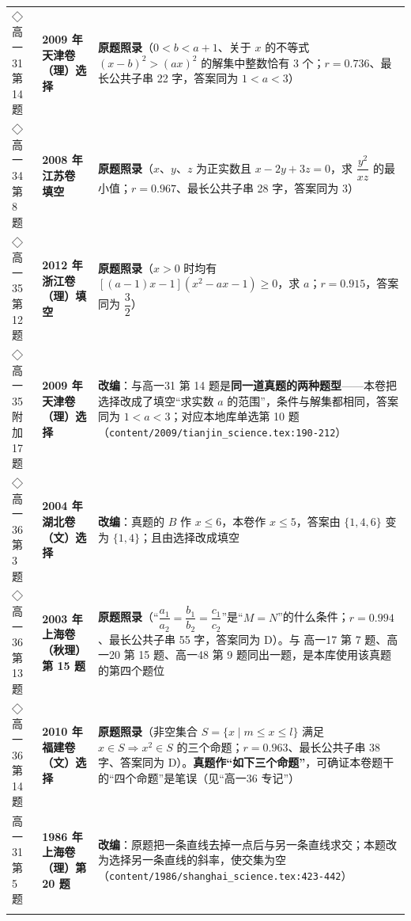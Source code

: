 \documentclass[a4paper,11pt]{article}
\begin{document}
\begin{xltabular}{\textwidth}{@{}>{\raggedright\arraybackslash}p{2.85cm}>{\raggedright\arraybackslash}p{3.99cm}>{\raggedright\arraybackslash}p{7.89cm}@{}}
◇高一31 第 14 题 & \textbf{2009 年天津卷（理）选择} & \textbf{原题照录}（\(0<b<a+\allowbreak 1\)、关于 \(x\) 的不等式 \((x-b)^2>(ax)^2\) 的解集中整数恰有 \(3\) 个；\(r=\allowbreak 0.736\)、最长公共子串 22 字，答案同为 \(1<a<3\)） \\ \addlinespace[1pt]
◇高一34 第 8 题 & \textbf{2008 年江苏卷 填空} & \textbf{原题照录}（\(x\)、\(y\)、\(z\) 为正实数且 \(x-2y+\allowbreak 3z=\allowbreak 0\)，求 \(\dfrac{y^2}{xz}\) 的最小值；\(r=\allowbreak 0.967\)、最长公共子串 28 字，答案同为 \(3\)） \\ \addlinespace[1pt]
◇高一35 第 12 题 & \textbf{2012 年浙江卷（理）填空} & \textbf{原题照录}（\(x>0\) 时均有 \([(a-1)x-1](x^2-ax-1)\geqslant\allowbreak 0\)，求 \(a\)；\(r=\allowbreak 0.915\)，答案同为 \(\dfrac32\)） \\ \addlinespace[1pt]
◇高一35 附加 17 题 & \textbf{2009 年天津卷（理）选择} & \textbf{改编}：与高一31 第 14 题是\textbf{同一道真题的两种题型}------本卷把选择改成了填空``求实数 \(a\) 的范围''，条件与解集都相同，答案同为 \(1<a<3\)；对应本地库单选第 10 题（\texttt{content/\allowbreak{}2009/\allowbreak{}tianjin\_science.tex:190-\allowbreak{}212}） \\ \addlinespace[1pt]
◇高一36 第 3 题 & \textbf{2004 年湖北卷（文）选择} & \textbf{改编}：真题的 \(B\) 作 \(x\leqslant\allowbreak 6\)，本卷作 \(x\leqslant\allowbreak 5\)，答案由 \(\{1,\allowbreak 4,\allowbreak 6\}\) 变为 \(\{1,\allowbreak 4\}\)；且由选择改成填空 \\ \addlinespace[1pt]
◇高一36 第 13 题 & \textbf{2003 年上海卷（秋理）第 15 题} & \textbf{原题照录}（``\(\dfrac{a_1}{a_2}=\allowbreak \dfrac{b_1}{b_2}=\allowbreak \dfrac{c_1}{c_2}\)''是``\(M=N\)''的什么条件；\(r=\allowbreak 0.994\)、最长公共子串 55 字，答案同为 D）。与 高一17 第 7 题、高一20 第 15 题、高一48 第 9 题同出一题，是本库使用该真题的第四个题位 \\ \addlinespace[1pt]
◇高一36 第 14 题 & \textbf{2010 年福建卷（文）选择} & \textbf{原题照录}（非空集合 \(S=\allowbreak \{x\mid\allowbreak  m\leqslant\allowbreak  x\leqslant\allowbreak  l\}\) 满足 \(x\in S\Rightarrow x^2\in S\) 的三个命题；\(r=\allowbreak 0.963\)、最长公共子串 38 字、答案同为 D）。\textbf{真题作``如下三个命题''}，可确证本卷题干的``四个命题''是笔误（见``高一36 专记''） \\ \addlinespace[1pt]
高一31 第 5 题 & \textbf{1986 年上海卷（理）第 20 题} & \textbf{改编}：原题把一条直线去掉一点后与另一条直线求交；本题改为选择另一条直线的斜率，使交集为空（\texttt{content/\allowbreak{}1986/\allowbreak{}shanghai\_science.tex:423-\allowbreak{}442}） \\ \addlinespace[1pt]

\end{xltabular}
\end{document}
